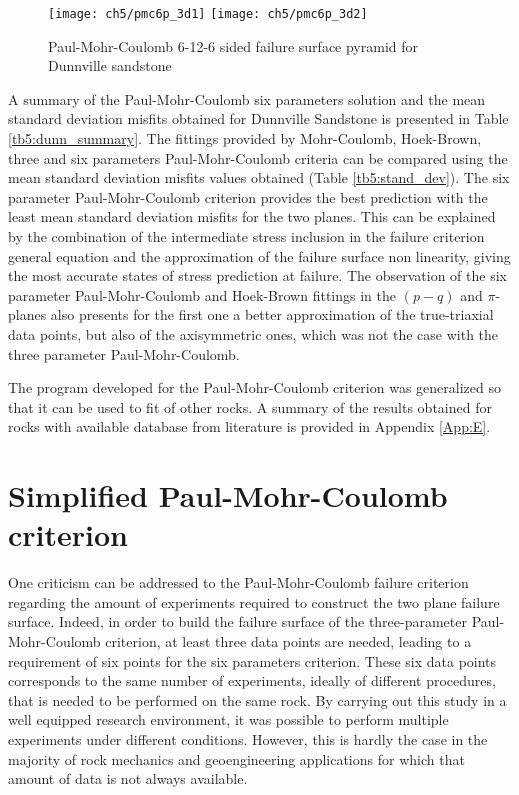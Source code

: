 \begin{figure}
    \centering
    \texttt{[image: ch5/pmc6p\_3d1]}
    \texttt{[image: ch5/pmc6p\_3d2]}
    \caption{Paul-Mohr-Coulomb 6-12-6 sided failure surface pyramid for Dunnville sandstone}
    \label{fig5:pmc6p_3d}
\end{figure}

A summary of the Paul-Mohr-Coulomb six parameters solution and the mean standard deviation misfits obtained for Dunnville Sandstone is presented in Table \ref{tb5:dunn_summary}. The fittings provided by Mohr-Coulomb, Hoek-Brown, three and six parameters Paul-Mohr-Coulomb criteria can be compared using the mean standard deviation misfits values obtained (Table \ref{tb5:stand_dev}). 
The six parameter Paul-Mohr-Coulomb criterion provides the best prediction with the least mean standard deviation misfits for the two planes. This can be explained by the combination of the intermediate stress inclusion in the failure criterion general equation and the approximation of the failure surface non linearity, giving the most accurate states of stress prediction at failure. The observation of the six parameter Paul-Mohr-Coulomb and Hoek-Brown fittings in the $(p-q)$ and $\pi$- planes also presents for the first one a better approximation of the true-triaxial data points, but also of the axisymmetric ones, which was not the case with the three parameter Paul-Mohr-Coulomb. 

The program developed for the Paul-Mohr-Coulomb criterion was generalized so that it can be used to fit of other rocks. A summary of the results obtained for rocks with available database from literature is provided in Appendix \ref{App:E}.

\newpage
\section{Simplified Paul-Mohr-Coulomb criterion}

One criticism can be addressed to the Paul-Mohr-Coulomb failure criterion regarding the amount of experiments required to construct the two plane failure surface. Indeed, in order to build the failure surface of the three-parameter Paul-Mohr-Coulomb criterion, at least three data points are needed, leading to a requirement of six points for the six parameters criterion. These six data points corresponds to the same number of experiments, ideally of different procedures, that is needed to be performed on the same rock. By carrying out this study in a well equipped research environment, it was possible to perform multiple experiments under different conditions. However, this is hardly the case in the majority of rock mechanics and geoengineering applications for which that amount of data is not always available.

